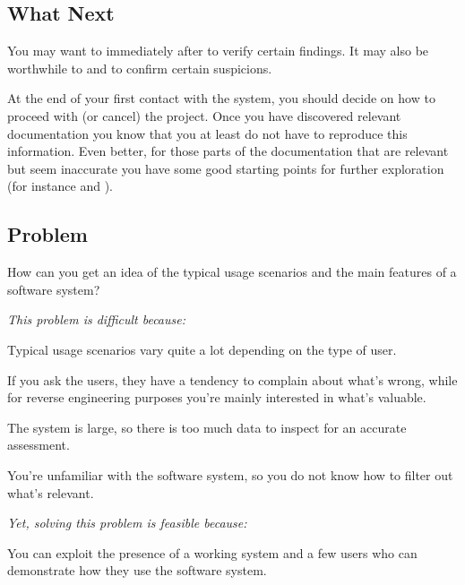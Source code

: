 \documentclass[a4paper,10pt,twoside]{book}
\begin{document}
\subsection*{What Next}

You may want to  immediately after  to verify certain findings. It may also be worthwhile to  and  to confirm certain suspicions.

At the end of your first contact with the system, you should decide on how to proceed with (or cancel) the project. Once you have discovered relevant documentation you know that you at least do not have to reproduce this information. Even better, for those parts of the documentation that are relevant but seem inaccurate you have some good starting points for further exploration (for instance  and ).



\subsection*{Problem}

How can you get an idea of the typical usage scenarios and the main features of a software system?

\emph{This problem is difficult because:}

\begin{bulletlist}
  \item Typical usage scenarios vary quite a lot depending on the type of user.

  \item If you ask the users, they have a tendency to complain about what's wrong, while for reverse engineering purposes you're mainly interested in what's valuable.

  \item The system is large, so there is too much data to inspect for an accurate assessment.

  \item You're unfamiliar with the software system, so you do not know how to filter out what's relevant.

\emph{Yet, solving this problem is feasible because:}

  \item You can exploit the presence of a working system and a few users who can demonstrate how they use the software system.
\end{bulletlist}
\end{document}
